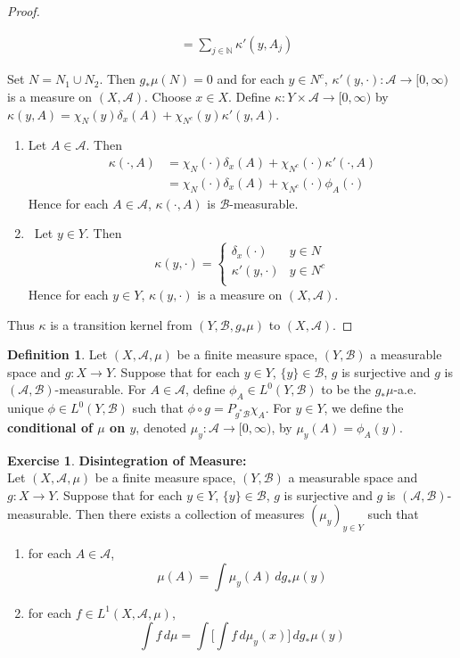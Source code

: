 \documentclass[12pt]{amsart}
\theoremstyle{definition}
\newtheorem{defn}[definition]{Definition}
\newtheorem{ex}[definition]{Exercise}
\newcommand{\del}{\delta}
\newcommand{\kap}{\kappa}
\newcommand{\N}{\mathbb{N}}
\newcommand{\MA}{\mathcal{A}}
\newcommand{\MB}{\mathcal{B}}
\newcommand{\dmu}{\, d \mu}
\newcommand{\Rg}{[0,\infty)}
\begin{document}
\begin{proof}
\begin{itemize}
\begin{align*}
				& =  \sum\limits_{j \in \N} \kap'(y, A_j)
			\end{align*}
		\end{itemize}
		Set $N = N_1 \cup N_2$. Then $g_*\mu(N) = 0$ and for each $y \in N^c$, $\kap'(y, \cdot): \MA \rightarrow \Rg$ is a measure on $(X, \MA)$. Choose $x \in X$. Define $\kap: Y \times \MA \rightarrow \Rg$ by $\kap (y, A) = \chi_{N}(y)\del_{x}(A) + \chi_{N^c}(y)\kap'(y, A)$. 
		\begin{enumerate}
			\item Let $A \in \MA$. Then 
			\begin{align*}
				\kap(\cdot, A) 
				& = \chi_N(\cdot) \del_x(A) + \chi_{N^c}(\cdot) \kap'(\cdot, A) \\ 
				& = \chi_N(\cdot) \del_x(A) + \chi_{N^c}(\cdot) \phi_A(\cdot) 
			\end{align*}
			Hence for each $A \in \MA$, $\kap(\cdot, A)$ is $\MB$-measurable.
			\item \
			Let $y \in Y$. Then 
			\[
			\kap(y, \cdot) = 
			\begin{cases}
				\del_x(\cdot) & y \in N \\
				\kap'(y, \cdot) & y \in N^c \\
			\end{cases}
			\]
			Hence for each $y \in Y$, $\kap(y, \cdot)$ is a measure on $(X, \MA)$. 
		\end{enumerate}
		Thus $\kap$ is a transition kernel from $(Y, \MB, g_*\mu)$ to $(X, \MA)$.
	\end{proof}
	
	\begin{defn}
		Let $(X, \MA, \mu)$ be a finite measure space, $(Y, \MB)$ a measurable space and $g: X \rightarrow Y$. Suppose that for each $y \in Y$, $\{y\} \in \MB$, $g$ is surjective and $g$ is $(\MA, \MB)$-measurable. For $A \in \MA$, define $\phi_A \in L^0(Y, \MB )$ to be the $g_*\mu$-a.e. unique $\phi \in L^0(Y, \MB)$ such that $\phi \circ g = P_{g^*\MB} \chi_A$. For $y \in Y$, we define the \textbf{conditional of $\mu$ on $y$}, denoted $\mu_y : \MA \rightarrow \Rg$, by $\mu_y(A) = \phi_A(y)$. 
	\end{defn}
	
	\begin{ex} \textbf{Disintegration of Measure:} \\
		Let $(X, \MA, \mu)$ be a finite measure space, $(Y, \MB)$ a measurable space and $g: X \rightarrow Y$. Suppose that for each $y \in Y$, $\{y\} \in \MB$, $g$ is surjective and $g$ is $(\MA, \MB)$-measurable. Then there exists a collection of measures $(\mu_y)_{y \in Y}$ such that  
		\begin{enumerate}
			\item for each $A \in \MA$, 
			$$\mu(A) = \int \mu_y(A) \, d g_*\mu(y) $$
			\item for each $f \in L^1(X, \MA, \mu)$, 
			$$\int f \dmu = \int \bigg[ \int f \, d\mu_y(x) \bigg] \, d g_*\mu(y)$$ 
		\end{enumerate}
	\end{ex}
	
\end{document}
